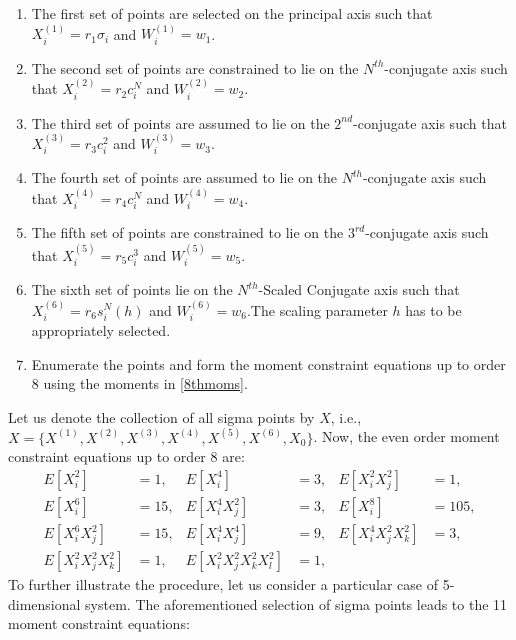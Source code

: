 \documentclass[letterpaper, 10 pt, conference]{IEEEtran}  %
\newcommand{\comments}[1]{}
\begin{document}
\begin{enumerate}
\item The first set of points are selected on the principal axis such that $X^{(1)}_i=r_1\sigma_i$ and $W^{(1)}_i=w_1$.
\item The second set of points are constrained to lie on the $N^{th}$-conjugate axis such that $X^{(2)}_i=r_2c_i^N$ and $W^{(2)}_i=w_2$.
\item The third set of points are assumed to lie on the $2^{nd}$-conjugate axis such that $X^{(3)}_i=r_3c_i^2$ and $W^{(3)}_i=w_3$.
\item The fourth set of points are assumed to lie on the $N^{th}$-conjugate axis such that $X^{(4)}_i=r_4c_i^N$ and $W^{(4)}_i=w_4$.
\item The fifth set of points are constrained to lie on the $3^{rd}$-conjugate axis such that $X^{(5)}_i=r_5c_i^3$ and $W^{(5)}_i=w_5$.
\item The sixth set of points lie on the $N^{th}$-Scaled Conjugate axis such that $X^{(6)}_i=r_6s^N_i(h)$ and $W^{(6)}_i=w_6$.The scaling parameter $h$ has to be appropriately selected.
\item Enumerate the points and form the moment constraint equations up to order 8 using the moments in \eqref{8thmoms}.
\end{enumerate}
Let us denote the collection of all sigma points by $X$, i.e., $X=\{X^{(1)},X^{(2)},X^{(3)},X^{(4)},X^{(5)},X^{(6)},X_0\}$. Now, the even order moment constraint equations up to order 8 are: 
\begin{align}
E[X_i^2]&=1,  &E[X_i^4]&=3, &E[X_i^2X_j^2]&=1, \nonumber\\
E[X_i^6]&=15, &E[X_i^4X_j^2]&=3, &E[X_i^8]&=105, \nonumber\\
E[X_i^6X_j^2]&=15, &E[X_i^4X_j^4]&=9, &E[X_i^4X_j^2X_k^2]&=3,\nonumber\\
E[X_i^2X_j^2X_k^2]&=1, &E[X_i^2X_j^2X_k^2X_l^2]&=1, \label{8thmoms}
\end{align}
To further illustrate the procedure, let us consider a particular case of 5-dimensional system. The aforementioned selection of sigma points leads to the 11 moment constraint equations:
\vspace{-0.1in}
\end{document}
